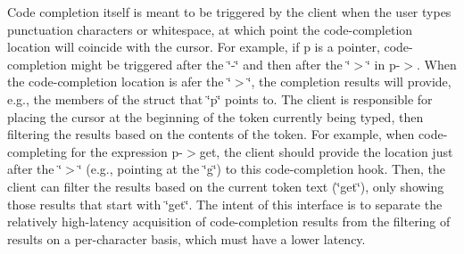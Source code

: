 Code completion itself is meant to be triggered by the client when the user types punctuation characters or whitespace, at which point the code-\/completion location will coincide with the cursor. For example, if {\ttfamily p} is a pointer, code-\/completion might be triggered after the \char`\"{}-\/\char`\"{} and then after the \char`\"{}$>$\char`\"{} in {\ttfamily p-\/$>$}. When the code-\/completion location is afer the \char`\"{}$>$\char`\"{}, the completion results will provide, e.\+g., the members of the struct that \char`\"{}p\char`\"{} points to. The client is responsible for placing the cursor at the beginning of the token currently being typed, then filtering the results based on the contents of the token. For example, when code-\/completing for the expression {\ttfamily p-\/$>$get}, the client should provide the location just after the \char`\"{}$>$\char`\"{} (e.\+g., pointing at the \char`\"{}g\char`\"{}) to this code-\/completion hook. Then, the client can filter the results based on the current token text (\char`\"{}get\char`\"{}), only showing those results that start with \char`\"{}get\char`\"{}. The intent of this interface is to separate the relatively high-\/latency acquisition of code-\/completion results from the filtering of results on a per-\/character basis, which must have a lower latency.


